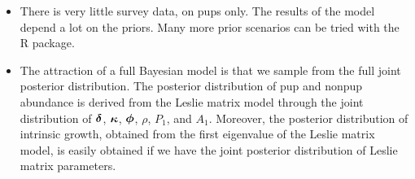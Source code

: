 \documentclass[mathserif,compress]{beamer}
\def\bdelta{\mbox{\boldmath $\delta$}}
\def\bphi{\mbox{\boldmath $\phi$}}
\def\bkappa{\mbox{\boldmath $\kappa$}}
\begin{document}

\begin{frame}

\begin{itemize}
 
  \item There is very little survey data, on pups only.  The results of the model depend a lot on the priors.  Many more prior scenarios can be tried with the R package.

  \item The attraction of a full Bayesian model is that we sample from the full joint posterior distribution.  The posterior distribution of pup and nonpup abundance is derived from the Leslie matrix model through the joint distribution of $\bdelta$, $\bkappa$, $\bphi$, $\rho$, $P_{1}$, and $A_{1}$.  Moreover, the posterior distribution of intrinsic growth, obtained from the first eigenvalue of the Leslie matrix model, is easily obtained if we have the joint posterior distribution of Leslie matrix parameters.
 
\end{itemize}

\end{frame}


\end{document}
